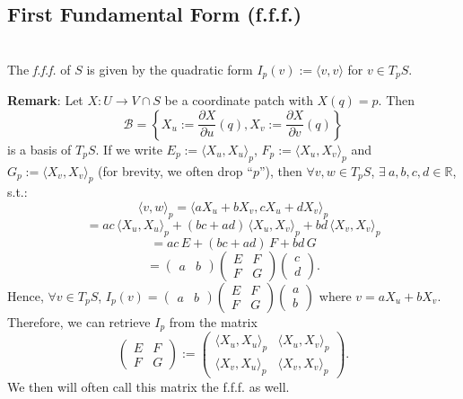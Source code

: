 \subsection{First Fundamental Form (f.f.f.)}

\\
The \textit{f.f.f.} of $S$ is given by the quadratic form $I_p(v) := \langle v, v\rangle$ for $v\in T_pS$.

\noindent\textbf{Remark}: Let $X: U\to V\cap S$ be a coordinate patch with $X(q) = p$. Then
\[
\mathcal{B} = \left\{X_u := \frac{\partial X}{\partial u}(q), X_v := \frac{\partial X}{\partial v}(q)\right\}
\]
is a basis of $T_pS$. If we write $E_p := \langle X_u, X_u\rangle_p$, $F_p := \langle X_u, X_v\rangle_p$ and $G_p := \langle X_v, X_v\rangle_p$ (for brevity, we often drop ``$p$''), then $\forall v, w\in T_pS$, $\exists\ a, b, c, d\in\mathbb{R}$, s.t.:
\[
\langle v, w\rangle_p = \langle aX_u + bX_v, cX_u + dX_v\rangle_p
\]
\[
= ac\,\langle X_u, X_u\rangle_p + (bc + ad)\,\langle X_u, X_v\rangle_p + bd\,\langle X_v, X_v\rangle_p
\]
\[
= ac\,E + (bc + ad)\,F + bd\,G
\]
\[
= \begin{pmatrix}a & b\end{pmatrix}\begin{pmatrix}E & F\\ F & G\end{pmatrix}\begin{pmatrix}c\\ d\end{pmatrix}.
\]
Hence, $\forall v\in T_pS$, $I_p(v) = \begin{pmatrix}a & b\end{pmatrix}\begin{pmatrix}E & F\\ F & G\end{pmatrix}\begin{pmatrix}a\\ b\end{pmatrix}$ where $v = aX_u + bX_v$. Therefore, we can retrieve $I_p$ from the matrix
\[
\begin{pmatrix}E & F\\ F & G\end{pmatrix} := \begin{pmatrix}\langle X_u, X_u\rangle_p & \langle X_u, X_v\rangle_p\\ \langle X_v, X_u\rangle_p & \langle X_v, X_v\rangle_p\end{pmatrix}.
\]
We then will often call this matrix the f.f.f. as well.

